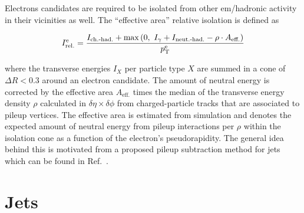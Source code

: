 
Electrons candidates are required to be isolated from other \gls{em}/hadronic activity in their vicinities as well. The ``effective area'' relative isolation is defined as

\begin{equation}
I_\mathrm{rel.}^\mathrm{e}=\frac{I_\text{ch.-had.}+\max\left(0,~I_{\gamma}+I_\text{neut.-had.}-\rho\cdot A_\text{eff.}\right)}{p_\mathrm{T}^\mathrm{e}}
\end{equation}

where the transverse energies $I_{X}$ per particle type $X$ are summed in a cone of $\Delta R<0.3$ around an electron candidate. The amount of neutral energy is corrected by the effective area $A_\text{eff.}$ times the median of the transverse energy density $\rho$ calculated in $\delta\eta\times\delta\phi$ from charged-particle tracks that are associated to pileup vertices. The effective area is estimated from simulation and denotes the expected amount of neutral energy from pileup interactions per $\rho$ within the isolation cone as a function of the electron's pseudorapidity. The general idea behind this is motivated from a proposed pileup subtraction method for jets which can be found in Ref.~\cite{Cacciari:2007fd}.


\section{Jets}


